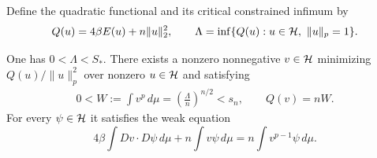 Define the quadratic functional and its critical constrained infimum by
\begin{equation}
 Q(u)=4\beta E(u)+n\|u\|_2^2,
 \qquad
 \Lambda=\inf\{Q(u):u\in\mathcal H,\ \|u\|_p=1\}.
 \label{eq:critical-variational-problem}
\end{equation}

\begin{proposition}
\label{prop:minimizer}
One has $0<\Lambda<S_*$.  There exists a nonzero nonnegative
$v\in\mathcal H$ minimizing $Q(u)/\|u\|_p^2$ over nonzero $u\in\mathcal H$
and satisfying
\begin{equation}
 \begin{split}
 0<W:=\int v^p\,d\mu
       =\left(\frac\Lambda n\right)^{n/2}<s_n,
 \qquad Q(v)=nW.
 \end{split}
 \label{eq:minimizer-normalization}
\end{equation}
For every $\psi\in\mathcal H$ it satisfies the weak equation
\begin{equation}
 4\beta\int Dv\cdot D\psi\,d\mu+n\int v\psi\,d\mu
   =n\int v^{p-1}\psi\,d\mu.
 \label{eq:euler}
\end{equation}
\end{proposition}

